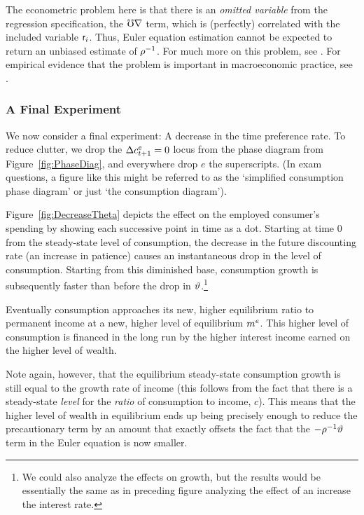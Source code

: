 \message{ !name(TractableBufferStock.tex)}\documentclass{handout}
\begin{document}
The econometric problem here is that there is an {\it omitted
variable} from the regression specification, the $\mho \nabla$ term, which is (perfectly) correlated with the included
variable $\mathsf{r}_{i}$.  Thus, Euler equation estimation cannot be expected to
return an unbiased estimate of $\rho^{-1}$.  For much more on this
problem, see \cite{carroll:death}.  For empirical evidence
that the problem is important in macroeconomic practice, see \cite{ParkerPrestonPrecaution}.

\subsubsection{A Final Experiment}
We now consider a final experiment: A decrease in the time preference
rate.  To reduce clutter, we drop the $\Delta c^{e}_{t+1}=0$ locus from the 
phase diagram from Figure~\ref{fig:PhaseDiag}, and everywhere drop $e$ the superscripts.  
(In exam questions, a figure like this might be referred to as the `simplified consumption phase diagram' or just
`the consumption diagram').

Figure~\ref{fig:DecreaseTheta} depicts the effect on the 
employed consumer's spending by
showing each successive point in time as a dot.  
Starting at time 0 from the steady-state level of consumption, the
decrease in the future discounting rate (an increase in patience) causes
an instantaneous drop in the level of consumption.  Starting from this diminished 
base, consumption growth is subsequently faster than before the drop in $\vartheta$.\footnote{We could also analyze the effects on growth, but the
  results would be essentially the same as in preceding figure
  analyzing the effect of an increase the interest rate.}

Eventually consumption approaches its new, higher equilibrium ratio
to permanent income at a new, higher level of equilibrium $m^{e}$.  This
higher level of consumption is financed in the long run by the higher
interest income earned on the higher level of wealth.

Note again, however, that the equilibrium steady-state 
consumption growth is still equal to the growth rate of income (this follows
from the fact that there is a steady-state {\it level} for the {\it
  ratio} of consumption to income, $c$).  This means that the higher
level of wealth in equilibrium ends up being precisely enough to
reduce the precautionary term by an amount that exactly offsets the
fact that the $-\rho^{-1}\vartheta$ term in the Euler equation is now
smaller.
\end{document}
